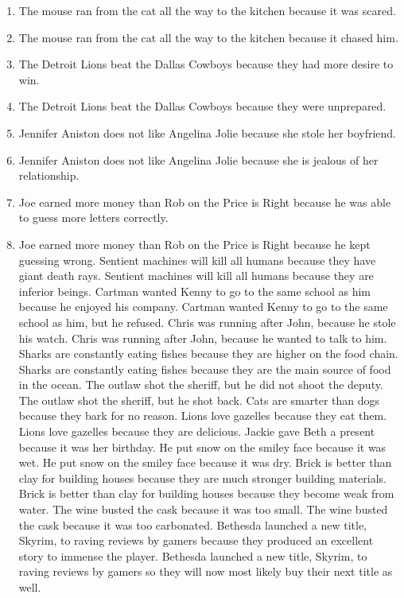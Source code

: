\documentclass{article}
\begin{document}
\begin{enumerate}
	\item The mouse ran from the cat all the way to the kitchen because it was scared.
	\item The mouse ran from the cat all the way to the kitchen because it chased him.
	\item The Detroit Lions beat the Dallas Cowboys because they had more desire to win.
	\item The Detroit Lions beat the Dallas Cowboys because they were unprepared.
	\item Jennifer Aniston does not like Angelina Jolie because she stole her boyfriend.
	\item Jennifer Aniston does not like Angelina Jolie because she is jealous of her relationship.
	\item Joe earned more money than Rob on the Price is Right because he was able to guess more letters correctly.
	\item Joe earned more money than Rob on the Price is Right because he kept guessing wrong.
	Sentient machines will kill all humans because they have giant death rays.
	Sentient machines will kill all humans because they are inferior beings.
	Cartman wanted Kenny to go to the same school as him because he enjoyed his company.
	Cartman wanted Kenny to go to the same school as him, but he refused.
	Chris was running after John, because he stole his watch.
	Chris was running after John, because he wanted to talk to him.
	Sharks are constantly eating fishes because they are higher on the food chain.
	Sharks are constantly eating fishes because they are the main source of food in the ocean.
	The outlaw shot the sheriff, but he did not shoot the deputy.
	The outlaw shot the sheriff, but he shot back.
	Cats are smarter than dogs because they bark for no reason.
	Lions love gazelles because they eat them.
	Lions love gazelles because they are delicious.
	Jackie gave Beth a present because it was her birthday.
	He put snow on the smiley face because it was wet.
	He put snow on the smiley face because it was dry.
	Brick is better than clay for building houses because they are much stronger building materials.
	Brick is better than clay for building houses because they become weak from water.
	The wine busted the cask because it was too small.
	The wine busted the cask because it was too carbonated.
	Bethesda launched a new title, Skyrim, to raving reviews by gamers because they produced an excellent story to immense the player.
	Bethesda launched a new title, Skyrim, to raving reviews by gamers so they will now most likely buy their next title as well.

\end{enumerate}
\end{document}
